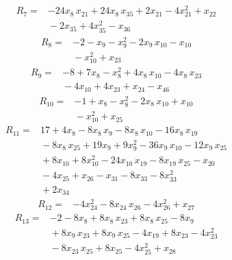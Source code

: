 \documentclass[11pt]{article}
\begin{document}
\begin{equation*}\begin{aligned}
R_{7}={}&-24x_{8}\,x_{21} + 24x_{8}\,x_{35} + 2x_{21} - 4x_{21}^{2} + x_{22} \\
&{} - 2x_{35} + 4x_{35}^{2} - x_{36}
\end{aligned}\end{equation*}
\begin{equation*}\begin{aligned}
R_{8}={}&-2 - x_{9} - x_{9}^{2} - 2x_{9}\,x_{10} - x_{10} \\
&{} - x_{10}^{2} + x_{23}
\end{aligned}\end{equation*}
\begin{equation*}\begin{aligned}
R_{9}={}&-8 + 7x_{8} - x_{8}^{2} + 4x_{8}\,x_{10} - 4x_{8}\,x_{23} \\
&{} - 4x_{10} + 4x_{23} + x_{24} - x_{46}
\end{aligned}\end{equation*}
\begin{equation*}\begin{aligned}
R_{10}={}&-1 + x_{8} - x_{8}^{2} - 2x_{8}\,x_{10} + x_{10} \\
&{} - x_{10}^{2} + x_{25}
\end{aligned}\end{equation*}
\begin{equation*}\begin{aligned}
R_{11}={}&17 + 4x_{8} - 8x_{8}\,x_{9} - 8x_{8}\,x_{10} - 16x_{8}\,x_{19} \\
&{} - 8x_{8}\,x_{25} + 19x_{9} + 9x_{9}^{2} - 36x_{9}\,x_{10} - 12x_{9}\,x_{25} \\
&{} + 8x_{10} + 8x_{10}^{2} - 24x_{10}\,x_{19} - 8x_{19}\,x_{25} - x_{20} \\
&{} - 4x_{25} + x_{26} - x_{31} - 8x_{33} - 8x_{33}^{2} \\
&{} + 2x_{34}
\end{aligned}\end{equation*}
\begin{equation*}\begin{aligned}
R_{12}={}&-4x_{24}^{2} - 8x_{24}\,x_{26} - 4x_{26}^{2} + x_{27}
\end{aligned}\end{equation*}
\begin{equation*}\begin{aligned}
R_{13}={}&-2 - 8x_{8} + 8x_{8}\,x_{23} + 8x_{8}\,x_{25} - 8x_{9} \\
&{} + 8x_{9}\,x_{23} + 8x_{9}\,x_{25} - 4x_{19} + 8x_{23} - 4x_{23}^{2} \\
&{} - 8x_{23}\,x_{25} + 8x_{25} - 4x_{25}^{2} + x_{28}
\end{aligned}\end{equation*}
\end{document}
